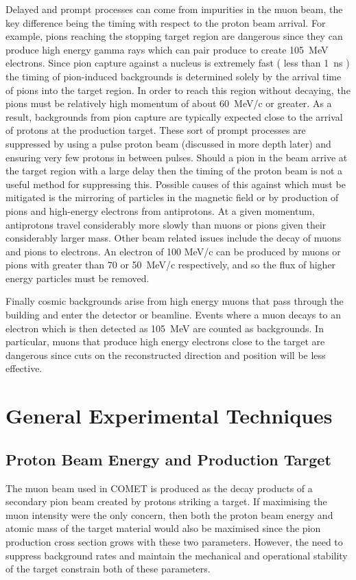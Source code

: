 \FigDecayInOrbitSpectrum


Delayed and prompt processes can come from impurities in the muon beam, the key difference being the timing with respect to the proton beam arrival.
For example, pions reaching the stopping target region are dangerous since they can produce high energy gamma rays which can pair produce to create 105~MeV electrons.
Since pion capture against a nucleus is extremely fast ( less than 1~ns ) the timing of pion-induced backgrounds is determined solely by the arrival time of pions into the target region.
In order to reach this region without decaying, the pions must be relatively high momentum of about 60~MeV/c or greater.  
As a result, backgrounds from pion capture are typically expected close to the arrival of protons at the production target.
These sort of prompt processes are suppressed by using a pulse proton beam (discussed in more depth later) and ensuring very few protons in between pulses.
Should a pion in the beam arrive at the target region with a large delay then the timing of the proton beam is not a useful method for suppressing this.  
Possible causes of this against which must be mitigated is the mirroring of particles in the magnetic field or by production of pions and high-energy electrons from antiprotons.
At a given momentum, antiprotons travel considerably more slowly than muons or pions given their considerably larger mass.
Other beam related issues include the decay of muons and pions to electrons.
An electron of 100 MeV/c can be produced by muons or pions with greater than 70 or 50~MeV/c respectively, and so the flux of higher energy particles must be removed.

Finally cosmic backgrounds arise from high energy muons that pass through the building and enter the detector or beamline.  
Events where a muon decays to an electron which is then detected as 105~MeV are counted as backgrounds.
In particular, muons that produce high energy electrons close to the target are dangerous since cuts on the reconstructed direction and position will be less effective.

\section{General Experimental Techniques}
\subsection{Proton Beam Energy and Production Target}
The muon beam used in COMET is produced as the decay products of a secondary pion beam created by protons striking a target.
If maximising the muon intensity were the only concern, then both the proton beam energy and atomic mass of the target material would also be maximised since the pion production cross section
grows with these two parameters.
However, the need to suppress background rates and maintain the mechanical and operational stability of the target constrain both of these parameters.

